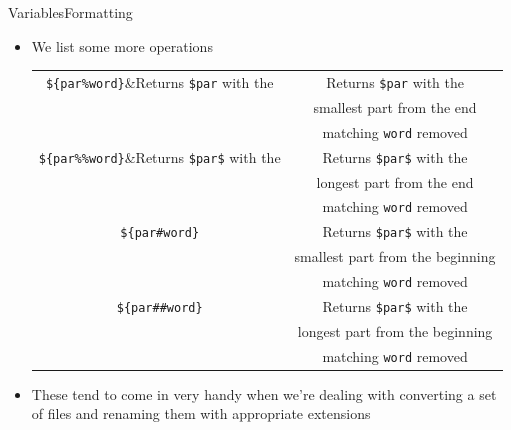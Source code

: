 \documentclass{beamer}
\begin{document}
\begin{frame}[fragile]{Variables}{Formatting}
  \begin{itemize}
  \item We list some more operations
    \begin{center}
      \begin{tabular}{|c|c|}
        \hline
        \verb|${par%word}|&Returns \verb+$par+ with the\\
                    &smallest part from the end\\
                    &matching \verb|word| removed\\\hline
        \verb|${par%%word}|&Returns \verb+$par$+ with the\\
                    &longest part from the end\\
                    &matching \verb|word| removed\\\hline
        \verb|${par#word}|&Returns \verb+$par$+ with the\\
                      &smallest part from the beginning\\
                      &matching \verb|word| removed\\\hline
        \verb|${par##word}|&Returns \verb+$par$+ with the\\
                    &longest part from the beginning\\
                    &matching \verb|word| removed\\\hline
      \end{tabular}
    \end{center}
  \item These tend to come in very handy when we're dealing with
    converting a set of files and renaming them with appropriate
    extensions
  \end{itemize}
\end{frame}
\end{document}
